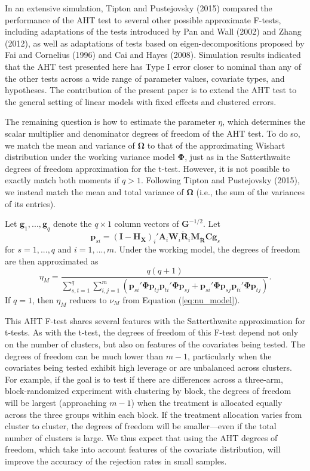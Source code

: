 \documentclass[12pt]{article}
\begin{document}
In an extensive simulation, Tipton and Pustejovsky (2015) compared the
performance of the AHT test to several other possible approximate
F-tests, including adaptations of the tests introduced by Pan and Wall
(2002) and Zhang (2012), as well as adaptations of tests based on
eigen-decompositions proposed by Fai and Cornelius (1996) and Cai and
Hayes (2008). Simulation results indicated that the AHT test presented
here has Type I error closer to nominal than any of the other tests
across a wide range of parameter values, covariate types, and
hypotheses. The contribution of the present paper is to extend the AHT
test to the general setting of linear models with fixed effects and
clustered errors.

The remaining question is how to estimate the parameter \(\eta\), which
determines the scalar multiplier and denominator degrees of freedom of
the AHT test. To do so, we match the mean and variance of
\(\boldsymbol\Omega\) to that of the approximating Wishart distribution
under the working variance model \(\boldsymbol\Phi\), just as in the
Satterthwaite degrees of freedom approximation for the t-test. However,
it is not possible to exactly match both moments if \(q > 1\). Following
Tipton and Pustejovsky (2015), we instead match the mean and total
variance of \(\boldsymbol\Omega\) (i.e., the sum of the variances of its
entries).

Let \(\mathbf{g}_1,...,\mathbf{g}_q\) denote the \(q \times 1\) column
vectors of \(\mathbf{G}^{-1/2}\). Let \[
\mathbf{p}_{si} = \left(\mathbf{I} - \mathbf{H_X}\right)_i' \mathbf{A}_i \mathbf{W}_i \mathbf{\ddot{R}}_i \mathbf{M_{\ddot{R}}}\mathbf{C} \mathbf{g}_s \]
for \(s = 1,...,q\) and \(i = 1,...,m\). Under the working model, the
degrees of freedom are then approximated as \begin{equation}
\label{eq:eta_model}
\eta_M = \frac{q(q + 1)}{\sum_{s,t=1}^q \sum_{i,j=1}^m \left(\mathbf{p}_{si}'\boldsymbol\Phi\mathbf{p}_{tj} \mathbf{p}_{ti}'\boldsymbol\Phi\mathbf{p}_{sj} + \mathbf{p}_{si}'\boldsymbol\Phi\mathbf{p}_{sj} \mathbf{p}_{ti}'\boldsymbol\Phi\mathbf{p}_{tj}\right)}.
\end{equation} If \(q = 1\), then \(\eta_M\) reduces to \(\nu_M\) from
Equation (\ref{eq:nu_model}).

This AHT F-test shares several features with the Satterthwaite
approximation for t-tests. As with the t-test, the degrees of freedom of
this F-test depend not only on the number of clusters, but also on
features of the covariates being tested. The degrees of freedom can be
much lower than \(m - 1\), particularly when the covariates being tested
exhibit high leverage or are unbalanced across clusters. For example, if
the goal is to test if there are differences across a three-arm,
block-randomized experiment with clustering by block, the degrees of
freedom will be largest (approaching \(m - 1\)) when the treatment is
allocated equally across the three groups within each block. If the
treatment allocation varies from cluster to cluster, the degrees of
freedom will be smaller---even if the total number of clusters is large.
We thus expect that using the AHT degrees of freedom, which take into
account features of the covariate distribution, will improve the
accuracy of the rejection rates in small samples.
\end{document}

